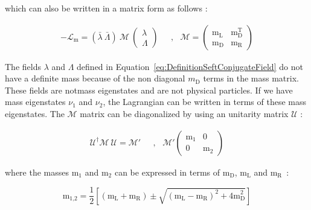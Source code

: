 \documentclass[main.tex]{subfiles}
\begin{document}
\smallskip


\NI which can also be written in a matrix form as follows : 



\begin{equation}
\begin{split}
-\mathcal{L}_\text{m} = (\bar{\lambda}~\bar{\Lambda}) ~ \mathcal{M} ~ \left( \begin{array}{c} 
\lambda \\
\Lambda  
\end{array} \right) & ~~~,~~~\mathcal{M} = \left( \begin{array}{cc}
\text{m}_\text{L} & \text{m}_\text{D}^\text{T} \\
\text{m}_\text{D} & \text{m}_\text{R}
\end{array}  \right)
\end{split} 
\end{equation}


\smallskip


\NI The fields $\lambda$ and $\Lambda$ defined in Equation~\ref{eq:DefinitionSeftConjugateField} do not have a definite mass because of the non diagonal $m_\text{D}$ terms in the mass matrix. These fields are notmass eigenstates and are not physical particles. If we have mass eigenstates $\nu_\text{1}$ and $\nu_\text{2}$, the Lagrangian can be written in terms of these mass eigenstates. The $\mathcal{M}$ matrix can be diagonalized by using an unitarity matrix $\mathcal{U}$ : 


\begin{equation}
\begin{split}
\mathcal{U}^\dag \mathcal{M}~\mathcal{U} = \mathcal{M}'    & ~~~,~~~\mathcal{M}' \left(   \begin{array}{cc}
\text{m}_\text{1} & \text{0} \\
\text{0} & \text{m}_\text{2} 
\end{array} \right)
\end{split} 
\end{equation}  


\smallskip


\NI where the masses m$_\text{1}$ and m$_\text{2}$ can be expressed in terms of m$_\text{D}$, m$_\text{L}$ and m$_\text{R}$~:   


\begin{equation}
\text{m}_{\text{1,2}} = \frac{\text{1}}{\text{2}} \left[ (\text{m}_\text{L} + \text{m}_\text{R}) \pm \sqrt{(\text{m}_\text{L} - \text{m}_\text{R})^\text{2} + \text{4m}_\text{D}^\text{2}}  \right] 
\end{equation}
\end{document}
